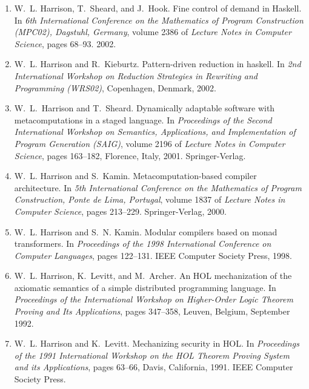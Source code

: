 \documentclass[12pt]{article} %
\begin{document}
\begin{enumerate}[leftmargin=0.0mm]
\item
W.~L. Harrison, T.~Sheard, and J.~Hook.
\newblock Fine control of demand in {Haskell}.
\newblock In {\em 6th International Conference on the Mathematics of Program
  Construction (MPC02), Dagstuhl, Germany}, volume 2386 of {\em Lecture Notes in Computer Science}, pages 68--93. 2002.

\item
W.~L. Harrison and R.~Kieburtz.
\newblock Pattern-driven reduction in haskell.
\newblock In {\em 2nd International Workshop on Reduction Strategies in
  Rewriting and Programming (WRS02)}, Copenhagen, Denmark, 2002.



\item
W.~L.~Harrison and T.~Sheard.
\newblock Dynamically adaptable software with metacomputations in a staged
  language.
\newblock In {\em Proceedings of the Second International Workshop on
  Semantics, Applications, and Implementation of Program Generation (SAIG)},
  volume 2196 of {\em Lecture Notes in Computer Science}, pages 163--182,
  Florence, Italy, 2001. Springer-Verlag.


\item
W.~L. Harrison and S.~Kamin.
\newblock Metacomputation-based compiler architecture.
\newblock In {\em 5th International Conference on the Mathematics of Program
  Construction, Ponte de Lima, Portugal}, volume 1837 of {\em Lecture Notes in
  Computer Science}, pages 213--229. Springer-Verlag, 2000.


\item
W.~L. Harrison and S.~N. Kamin.
\newblock Modular compilers based on monad transformers.
\newblock In {\em Proceedings of the 1998 International Conference on Computer
  Languages}, pages 122--131. IEEE Computer Society Press, 1998.


\item
W.~L. Harrison, K.~Levitt, and M.~Archer.
\newblock An {HOL} mechanization of the axiomatic semantics of a simple
  distributed programming language.
\newblock In {\em Proceedings of the International Workshop on Higher-Order
  Logic Theorem Proving and Its Applications}, pages 347--358, Leuven, Belgium,
  September 1992.

\item
W.~L. Harrison and K.~Levitt.
\newblock Mechanizing security in {HOL}.
\newblock In {\em Proceedings of the 1991 International Workshop on the {HOL}
  Theorem Proving System and its Applications}, pages 63--66, Davis,
  California, 1991. IEEE Computer Society Press.



\end{enumerate}
\end{document}
